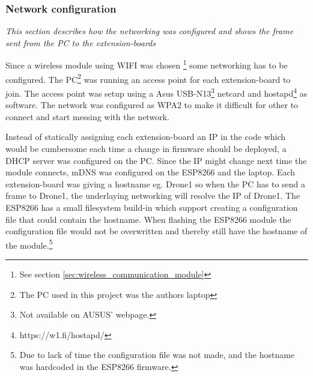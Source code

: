 \subsubsection{Network configuration} 
\textit{This section describes how the networking was configured and shows the frame sent from the PC to the extension-boards}

Since a wireless module using WIFI was chosen \footnote{See section \ref{sec:wireless_communication_module}} some networking has to be configured.
The PC\footnote{The PC used in this project was the authors laptop} was running an access point for each extension-board to join. The access point was setup using a Asus USB-N13\footnote{Not available on AUSUS' webpage.} netcard and hostapd\footnote{https://w1.fi/hostapd/} as software.  The network was configured as WPA2 to make it difficult for other to connect and start messing with the network.

Instead of statically assigning each extension-board an IP in the code which would be cumbersome each time a change in firmware should be deployed, a DHCP server was configured on the PC. Since the IP might change next time the module connects, mDNS was configured on the ESP8266 and the laptop. Each extension-board was giving a hostname eg. Drone1 so when the PC has to send a frame to Drone1, the underlaying networking will resolve the IP of Drone1. 
The ESP8266 has a small filesystem build-in which support creating a configuration file that could contain the hostname.
When flashing the ESP8266 module the configuration file would not be overwritten and thereby still have the hostname of the module.\footnote{Due to lack of time the configuration file was not made, and the hostname was hardcoded in the ESP8266 firmware.}
